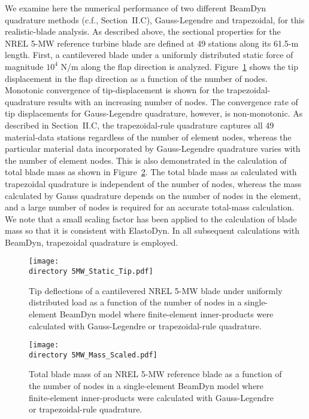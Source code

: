 \documentclass{aiaa-tc}
\def\directory{EPSF/}
\begin{document}
We examine here the numerical performance of two different BeamDyn quadrature methods (c.f., Section~II.C), Gauss-Legendre and trapezoidal, for this realistic-blade analysis.  
As described above, the sectional properties for the NREL 5-MW reference turbine blade are defined at 49 stations along its 61.5-m length.  
First, a cantilevered blade under a uniformly distributed static force of magnitude $10^4$ N/m along the flap direction is analyzed.
Figure~\ref{fig:5MWStaticTip} shows the tip displacement in the flap direction as a function of the number of nodes.  
Monotonic convergence of tip-displacement is shown for the trapezoidal-quadrature results with an increasing number of nodes.  
The convergence rate of tip displacements for Gauss-Legendre quadrature, however, is non-monotonic.  As described in Section~II.C, the trapezoidal-rule quadrature captures all 49 material-data stations regardless of the number of element nodes, whereas the particular material data incorporated by Gauss-Legendre quadrature varies with the number of element nodes.  
This is also demonstrated in the calculation of total blade mass as shown in Figure~\ref{fig:5MWMass}.  
The total blade mass as calculated with trapezoidal quadrature is independent of the number of nodes, whereas the mass calculated by Gauss quadrature  depends on the number of nodes in the
element, and a large number of nodes is required for an accurate total-mass
calculation.  
We note that a small scaling factor has been applied to the calculation of blade mass so that it is consistent with ElastoDyn.  
In all subsequent calculations with BeamDyn, trapezoidal quadrature is employed. 
\begin{figure}
\centering
\texttt{[image: \\directory 5MW\_Static\_Tip.pdf]}
\caption{Tip deflections of a cantilevered NREL 5-MW blade under uniformly distributed load as a function of the number of nodes in a single-element BeamDyn model where finite-element inner-products were calculated with Gauss-Legendre or trapezoidal-rule quadrature.} 
\label{fig:5MWStaticTip}
\end{figure}

\begin{figure}
    \centering
\texttt{[image: \\directory  5MW\_Mass\_Scaled.pdf]}
\caption{Total blade mass of an NREL 5-MW reference blade as a function of the number of nodes in a single-element BeamDyn model where finite-element inner-products were calculated with Gauss-Legendre or trapezoidal-rule quadrature.}
\label{fig:5MWMass}
\end{figure} 
\end{document}
